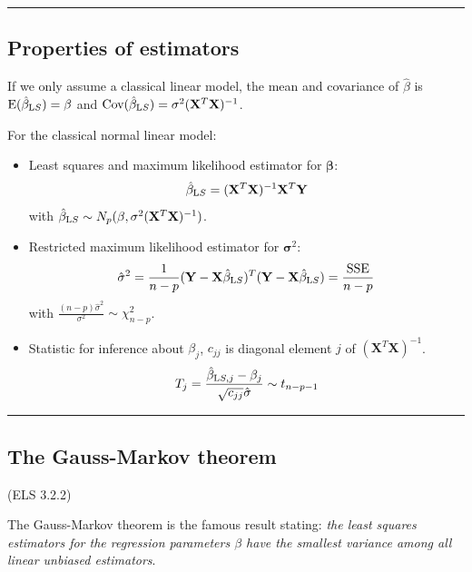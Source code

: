 \documentclass[
  letterpaper,
  DIV=11,
  numbers=noendperiod]{scrartcl}
\begin{document}
\begin{center}\rule{0.5\linewidth}{0.5pt}\end{center}

\hypertarget{properties-of-estimators}{%
\subsection{Properties of estimators}\label{properties-of-estimators}}

If we only assume a classical linear model, the mean and covariance of
\(\hat{\beta}\) is \(\text{E}(\hat{\beta}_{\text LS})=\beta\) and
\(\text{Cov}(\hat{\beta}_{\text LS})=\sigma^2({\mathbf X}^T{\mathbf X})^{-1}\).

For the classical normal linear model:

\begin{itemize}
\item
  Least squares and maximum likelihood estimator for
  \({\mathbf \beta}\):
  \[\hat{\beta}_{\text LS}=({\mathbf X}^T{\mathbf X})^{-1} {\mathbf X}^T {\mathbf Y}\]
  with
  \(\hat{\beta}_{\text LS}\sim N_{p}(\beta,\sigma^2({\mathbf X}^T{\mathbf X})^{-1})\).
\item
  Restricted maximum likelihood estimator for \({\mathbf \sigma}^2\):
  \[\hat{\sigma}^2=\frac{1}{n-p}({\mathbf Y}-{\mathbf X}\hat{\beta}_{\text LS})^T({\mathbf Y}-{\mathbf X}\hat{\beta}_{\text LS})=\frac{\text{SSE}}{n-p}\]
  with \(\frac{(n-p)\hat{\sigma}^2}{\sigma^2} \sim \chi^2_{n-p}\).
\item
  Statistic for inference about \(\beta_j\), \(c_{jj}\) is diagonal
  element \(j\) of \(({\mathbf X}^T{\mathbf X})^{-1}\).
  \[T_j=\frac{\hat{\beta}_{\text LS,j}-\beta_j}{\sqrt{c_{jj}}\hat{\sigma}}\sim t_{n-p-1}\]
\end{itemize}

\begin{center}\rule{0.5\linewidth}{0.5pt}\end{center}

\hypertarget{the-gauss-markov-theorem}{%
\subsection{The Gauss-Markov theorem}\label{the-gauss-markov-theorem}}

(ELS 3.2.2)

The Gauss-Markov theorem is the famous result stating: \emph{the least
squares estimators for the regression parameters \(\beta\) have the
smallest variance among all linear unbiased estimators}.
\end{document}
